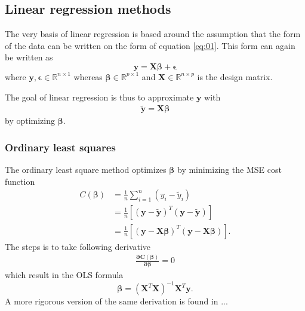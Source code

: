 \documentclass[uio,jmp,amsmath,amssymb,reprint,nofootinbib]{revtex4-1}
\numberwithin{equation}{section}
\newcommand{\lp}{\left(}
\newcommand{\rp}{\right)}
\newcommand{\lsb}{\left[}
\newcommand{\rsb}{\right]}
\begin{document}
\subsection{Linear regression methods}

The very basis of linear regression is based around the assumption that the form of the data can be written on the form of equation \ref{eq:01}. This form can again be written as
\begin{equation}
    \bm{y} = \bm{X}\bm{\beta} + \bm{\epsilon}
\end{equation}
where \(\bm{y}, \bm{\epsilon} \in \mathbb{R}^{n\times 1}\) whereas \(\bm{\beta} \in \mathbb{R}^{p\times 1}\) and \(\bm{X}  \in \mathbb{R}^{n\times p}\) is the design matrix.

The goal of linear regression is thus to approximate \(\bm{y}\) with
\begin{align}\label{eq:10}
    \bm{\tilde{y}} = \bm{X}\bm{\beta}
\end{align}
by optimizing \(\bm{\beta}\). 

\subsubsection{Ordinary least squares}

The ordinary least square method optimizes \(\bm{\beta}\) by minimizing the MSE cost function
\begin{align}
    C(\bm{\beta}) &= \frac{1}{n}\sum_{i=1}^n(y_i-\tilde{y}_i)\\
    &= \frac{1}{n}\lsb \lp \bm{y} - \bm{\tilde{y}}\rp^T\lp \bm{y} - \bm{\tilde{y}}\rp\rsb\\
    &= \frac{1}{n}\lsb \lp \bm{y} - \bm{X}\bm{\beta}\rp^T\lp \bm{y} - \bm{X}\bm{\beta}\rp\rsb.
\end{align}
The steps is to take following derivative
\begin{align}
    \bm{\frac{\partial C(\beta)}{\partial\beta}} = 0
\end{align}
which result in the OLS formula
\begin{equation}\label{eq:06}
    \bm{\beta} = (\bm{X}^T\bm{X})^{-1}\bm{X}^T\bm{y}.
\end{equation}
A more rigorous version of the same derivation is found in ...
\end{document}
